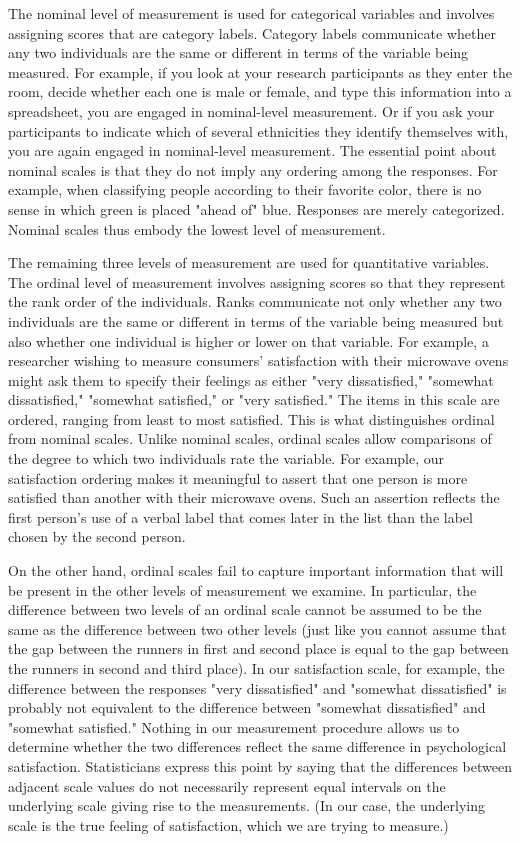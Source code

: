 The nominal level of measurement is used for categorical variables and involves assigning scores that are category labels. Category labels communicate whether any two individuals are the same or different in terms of the variable being measured. For example, if you look at your research participants as they enter the room, decide whether each one is male or female, and type this information into a spreadsheet, you are engaged in nominal-level measurement. Or if you ask your participants to indicate which of several ethnicities they identify themselves with, you are again engaged in nominal-level measurement. The essential point about nominal scales is that they do not imply any ordering among the responses. For example, when classifying people according to their favorite color, there is no sense in which green is placed "ahead of" blue. Responses are merely categorized. Nominal scales thus embody the lowest level of measurement.

The remaining three levels of measurement are used for quantitative variables. The ordinal level of measurement involves assigning scores so that they represent the rank order of the individuals. Ranks communicate not only whether any two individuals are the same or different in terms of the variable being measured but also whether one individual is higher or lower on that variable. For example, a researcher wishing to measure consumers' satisfaction with their microwave ovens might ask them to specify their feelings as either "very dissatisfied," "somewhat dissatisfied," "somewhat satisfied," or "very satisfied." The items in this scale are ordered, ranging from least to most satisfied. This is what distinguishes ordinal from nominal scales. Unlike nominal scales, ordinal scales allow comparisons of the degree to which two individuals rate the variable. For example, our satisfaction ordering makes it meaningful to assert that one person is more satisfied than another with their microwave ovens. Such an assertion reflects the first person's use of a verbal label that comes later in the list than the label chosen by the second person.

On the other hand, ordinal scales fail to capture important information that will be present in the other levels of measurement we examine. In particular, the difference between two levels of an ordinal scale cannot be assumed to be the same as the difference between two other levels (just like you cannot assume that the gap between the runners in first and second place is equal to the gap between the runners in second and third place). In our
satisfaction scale, for example, the difference between the responses "very dissatisfied" and "somewhat dissatisfied" is probably not equivalent to the difference between "somewhat dissatisfied" and "somewhat satisfied." Nothing in our measurement procedure allows us to determine whether the two differences reflect the same difference in psychological satisfaction. Statisticians express this point by saying that the differences between adjacent scale values do not necessarily represent equal intervals on the underlying scale giving rise to the measurements. (In our case, the underlying scale is the true feeling of satisfaction, which we are trying to measure.)

